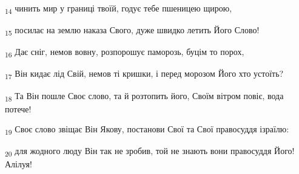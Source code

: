 \begin{tcolorbox}
\textsubscript{14} чинить мир у границі твоїй, годує тебе пшеницею щирою,
\end{tcolorbox}
\begin{tcolorbox}
\textsubscript{15} посилає на землю наказа Свого, дуже швидко летить Його Слово!
\end{tcolorbox}
\begin{tcolorbox}
\textsubscript{16} Дає сніг, немов вовну, розпорошує паморозь, буцім то порох,
\end{tcolorbox}
\begin{tcolorbox}
\textsubscript{17} Він кидає лід Свій, немов ті кришки, і перед морозом Його хто устоїть?
\end{tcolorbox}
\begin{tcolorbox}
\textsubscript{18} Та Він пошле Своє слово, та й розтопить його, Своїм вітром повіє, вода потече!
\end{tcolorbox}
\begin{tcolorbox}
\textsubscript{19} Своє слово звіщає Він Якову, постанови Свої та Свої правосуддя ізраїлю:
\end{tcolorbox}
\begin{tcolorbox}
\textsubscript{20} для жодного люду Він так не зробив, той не знають вони правосуддя Його! Алілуя!
\end{tcolorbox}
